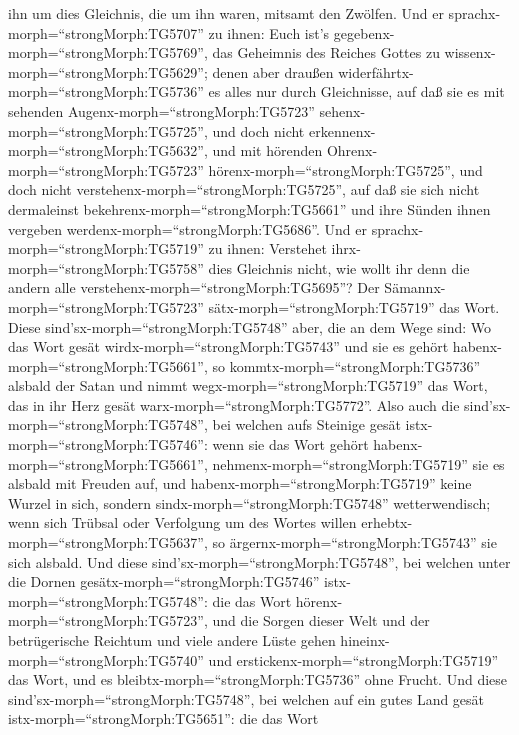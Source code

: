 ihn um dies Gleichnis, die um ihn waren, mitsamt den Zwölfen.
 Und er sprachx-morph=``strongMorph:TG5707'' zu ihnen: Euch
ist's gegebenx-morph=``strongMorph:TG5769'', das Geheimnis des Reiches
Gottes zu wissenx-morph=``strongMorph:TG5629''; denen aber draußen
widerfährtx-morph=``strongMorph:TG5736'' es alles nur durch Gleichnisse,
 auf daß sie es mit sehenden
Augenx-morph=``strongMorph:TG5723'' sehenx-morph=``strongMorph:TG5725'',
und doch nicht erkennenx-morph=``strongMorph:TG5632'', und mit hörenden
Ohrenx-morph=``strongMorph:TG5723'' hörenx-morph=``strongMorph:TG5725'',
und doch nicht verstehenx-morph=``strongMorph:TG5725'', auf daß sie sich
nicht dermaleinst bekehrenx-morph=``strongMorph:TG5661'' und ihre Sünden
ihnen vergeben werdenx-morph=``strongMorph:TG5686''.  Und
er sprachx-morph=``strongMorph:TG5719'' zu ihnen: Verstehet
ihrx-morph=``strongMorph:TG5758'' dies Gleichnis nicht, wie wollt ihr
denn die andern alle verstehenx-morph=``strongMorph:TG5695''?
 Der Sämannx-morph=``strongMorph:TG5723''
sätx-morph=``strongMorph:TG5719'' das Wort.  Diese
sind'sx-morph=``strongMorph:TG5748'' aber, die an dem Wege sind: Wo das
Wort gesät wirdx-morph=``strongMorph:TG5743'' und sie es gehört
habenx-morph=``strongMorph:TG5661'', so
kommtx-morph=``strongMorph:TG5736'' alsbald der Satan und nimmt
wegx-morph=``strongMorph:TG5719'' das Wort, das in ihr Herz gesät
warx-morph=``strongMorph:TG5772''.  Also auch die
sind'sx-morph=``strongMorph:TG5748'', bei welchen aufs Steinige gesät
istx-morph=``strongMorph:TG5746'': wenn sie das Wort gehört
habenx-morph=``strongMorph:TG5661'',
nehmenx-morph=``strongMorph:TG5719'' sie es alsbald mit Freuden auf,
 und habenx-morph=``strongMorph:TG5719'' keine Wurzel in
sich, sondern sindx-morph=``strongMorph:TG5748'' wetterwendisch; wenn
sich Trübsal oder Verfolgung um des Wortes willen
erhebtx-morph=``strongMorph:TG5637'', so
ärgernx-morph=``strongMorph:TG5743'' sie sich alsbald.  Und
diese sind'sx-morph=``strongMorph:TG5748'', bei welchen unter die Dornen
gesätx-morph=``strongMorph:TG5746'' istx-morph=``strongMorph:TG5748'':
die das Wort hörenx-morph=``strongMorph:TG5723'',  und die
Sorgen dieser Welt und der betrügerische Reichtum und viele andere Lüste
gehen hineinx-morph=``strongMorph:TG5740'' und
erstickenx-morph=``strongMorph:TG5719'' das Wort, und es
bleibtx-morph=``strongMorph:TG5736'' ohne Frucht.  Und
diese sind'sx-morph=``strongMorph:TG5748'', bei welchen auf ein gutes
Land gesät istx-morph=``strongMorph:TG5651'': die das Wort
